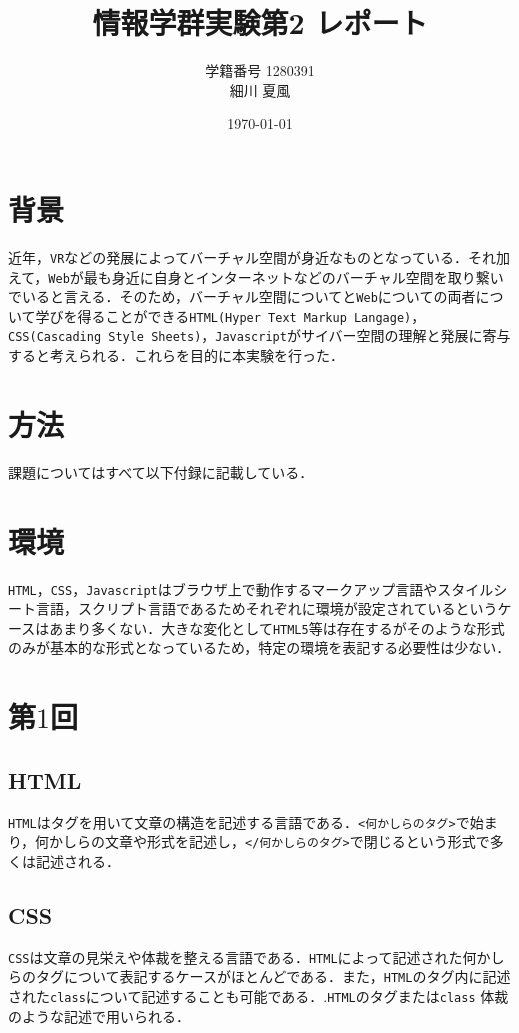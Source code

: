 \documentclass[paper=a4, fontsize=10pt]{jlreq}
\title{情報学群実験第2 レポート}
\author{学籍番号 1280391 \\ 細川 夏風}
\date{\today}
\begin{document}
\maketitle
\section{背景}
近年，\verb|VR|などの発展によってバーチャル空間が身近なものとなっている．それ加えて，\verb|Web|が最も身近に自身とインターネットなどのバーチャル空間を取り繋いでいると言える．そのため，バーチャル空間についてと\verb|Web|についての両者について学びを得ることができる\verb|HTML(Hyper Text Markup Langage)|，\verb|CSS(Cascading Style Sheets)|，\verb|Javascript|がサイバー空間の理解と発展に寄与すると考えられる．これらを目的に本実験を行った．

\section{方法}

課題についてはすべて以下付録に記載している．

\section*{環境}
\verb|HTML|，\verb|CSS|，\verb|Javascript|はブラウザ上で動作するマークアップ言語やスタイルシート言語，スクリプト言語であるためそれぞれに環境が設定されているというケースはあまり多くない．大きな変化として\verb|HTML5|等は存在するがそのような形式のみが基本的な形式となっているため，特定の環境を表記する必要性は少ない．

\section*{第$1$回}
\subsection*{HTML}
\verb|HTML|はタグを用いて文章の構造を記述する言語である．\verb|<何かしらのタグ>|で始まり，何かしらの文章や形式を記述し，\verb|</何かしらのタグ>|で閉じるという形式で多くは記述される．

\subsection*{CSS}
\verb|CSS|は文章の見栄えや体裁を整える言語である．\verb|HTML|によって記述された何かしらのタグについて表記するケースがほとんどである．また，\verb|HTML|のタグ内に記述された\verb|class|について記述することも可能である．.\verb|HTML|のタグまたは\verb|class|{ 体裁 }のような記述で用いられる．
\end{document}
